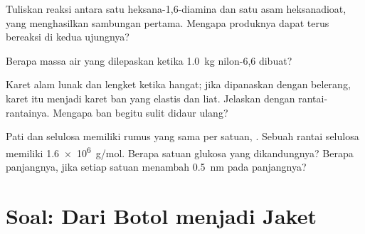 \begin{exercise}[$\star\star\star$]\label{exo:g12:polymers:12}
Tuliskan reaksi antara satu  heksana-1,6-diamina dan satu
 asam heksanadioat, yang menghasilkan sambungan  pertama.
Mengapa produknya dapat terus bereaksi di kedua ujungnya?
\end{exercise}

\begin{exercise}[$\star\star\star$]\label{exo:g12:polymers:13}
Berapa massa air yang dilepaskan ketika \qty{1.0}{kg} nilon-6,6
dibuat?
\end{exercise}

\begin{exercise}[$\star\star\star$]\label{exo:g12:polymers:14}
Karet alam lunak dan lengket ketika hangat; jika dipanaskan dengan
belerang, karet itu menjadi karet ban yang elastis dan liat. Jelaskan
dengan rantai-rantainya. Mengapa ban begitu sulit didaur ulang?
\end{exercise}

\begin{exercise}[$\star\star\star$]\label{exo:g12:polymers:15}
Pati dan selulosa memiliki rumus yang sama per satuan, .
Sebuah rantai selulosa memiliki  \qty{1.6e6}{g/mol}. Berapa
satuan glukosa yang dikandungnya? Berapa panjangnya, jika setiap satuan
menambah \qty{0.5}{nm} pada panjangnya?
\end{exercise}

\section{Soal: Dari Botol menjadi Jaket}

